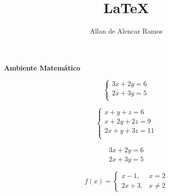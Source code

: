 \documentclass[12pt, a4paper]{article}
\begin{document}
\title{LaTeX}
\author{Allan de Alencar Ramos}
\maketitle

\begin{center}
\large\textbf{Ambiente Matemático}
\end{center}
\vspace{0.5cm}


\begin{equation}
\left\lbrace
\begin{array}{cc}
	3x + 2y = 6 \\
	2x + 3y = 5 \\
\end{array}
\right.
\end{equation}

\begin{equation}
\left\lbrace
\begin{array}{ccc}
	x + y + z = 6 \\
	x + 2y + 2z = 9 \\
	2x + y + 3z = 11 \\
\end{array}
\right.
\end{equation}

\begin{eqnarray}
	3x + 2y = 6 \\
	2x + 3y = 5
\end{eqnarray}

\begin{equation}
f(x) = 
\left\lbrace
\begin{array}{cc}
	x - 1, & x = 2 \\
	2x + 3, & x \neq 2
\end{array}
\right.
\end{equation}
\end{document}
